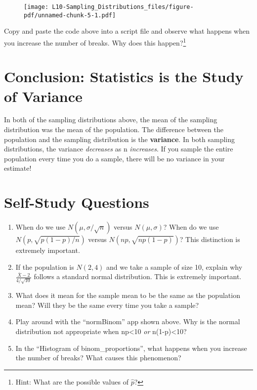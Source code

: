 \documentclass[
  letterpaper,
  DIV=11,
  numbers=noendperiod]{scrreprt}
\providecommand{\tightlist}{%
  \setlength{\itemsep}{0pt}\setlength{\parskip}{0pt}}\usepackage{longtable,booktabs,array}
\begin{document}
\begin{figure}[H]

{\centering \texttt{[image: L10-Sampling\_Distributions\_files/figure-pdf/unnamed-chunk-5-1.pdf]}

}

\end{figure}

Copy and paste the code above into a script file and observe what
happens when you increase the number of breaks. Why does this
happen?\footnote{Hint: What are the possible values of \(\hat p\)?}

\hypertarget{conclusion-statistics-is-the-study-of-variance}{%
\section{Conclusion: Statistics is the Study of
Variance}\label{conclusion-statistics-is-the-study-of-variance}}

In both of the sampling distributions above, the mean of the sampling
distribution was the mean of the population. The difference between the
population and the sampling distribution is the \textbf{variance}. In
both sampling distributions, the variance \emph{decreases} as n
\emph{increases}. If you sample the entire population every time you do
a sample, there will be no variance in your estimate!

\hypertarget{self-study-questions-2}{%
\section{Self-Study Questions}\label{self-study-questions-2}}

\begin{enumerate}
\def\labelenumi{\arabic{enumi}.}
\tightlist
\item
  When do we use \(N(\mu, \sigma/\sqrt{n})\) versus \(N(\mu, \sigma)\)?
  When do we use \(N(p, \sqrt{p(1-p)/n})\) versus
  \(N(np, \sqrt{np(1-p)})\)? This distinction is extremely important.
\item
  If the population is \(N(2,4)\) and we take a sample of size 10,
  explain why \(\frac{\bar X - 2}{4/\sqrt{10}}\) follows a standard
  normal distribution. This is extremely important.
\item
  What does it mean for the sample mean to be the same as the population
  mean? Will they be the same every time you take a sample?
\item
  Play around with the ``normBinom'' app shown above. Why is the normal
  distribution not appropriate when np\textless10 \emph{or}
  n(1-p)\textless10?
\item
  In the ``Histogram of binom\_proportions'', what happens when you
  increase the number of breaks? What causes this phenomenon?
\end{enumerate}
\end{document}
